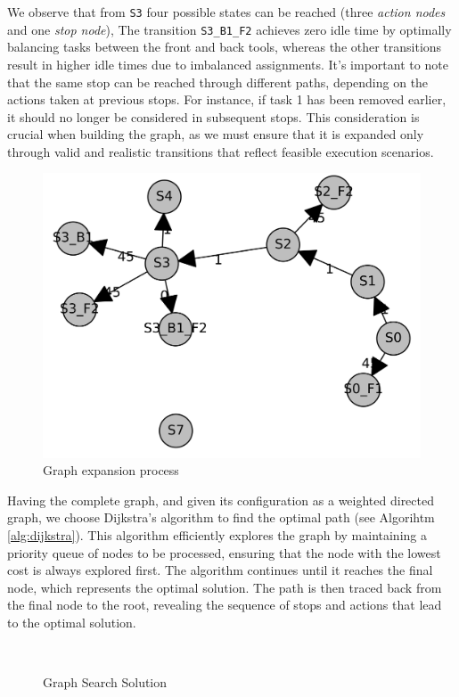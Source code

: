 We observe that from \texttt{S3} four possible states can be reached (three \textit{action nodes} and one \textit{stop node}), The transition \texttt{S3\_B1\_F2} achieves zero idle time by optimally balancing tasks between the front and back tools, whereas the other transitions result in higher idle times due to imbalanced assignments. It's important to note that the same stop can be reached through different paths, depending on the actions taken at previous stops. For instance, if task 1 has been removed earlier, it should no longer be considered in subsequent stops. This consideration is crucial when building the graph, as we must ensure that it is expanded only through valid and realistic transitions that reflect feasible execution scenarios.

\begin{figure}[hbt]
    \centering
    \includegraphics[width=0.7\linewidth]{gfx/ch02/building_graph.png}
    \caption{Graph expansion process}
    \label{fig:building-graph}
\end{figure}

Having the complete graph, and given its configuration as a weighted directed graph, we choose Dijkstra's algorithm to find the optimal path (see Algorihtm \ref{alg:dijkstra}). This algorithm efficiently explores the graph by maintaining a priority queue of nodes to be processed, ensuring that the node with the lowest cost is always explored first. The algorithm continues until it reaches the final node, which represents the optimal solution. The path is then traced back from the final node to the root, revealing the sequence of stops and actions that lead to the optimal solution.

\begin{figure}[htb]
    \myfloatalign
     \quad
     \\
    \caption{Graph Search Solution}\label{fig:graph-search-solution}
\end{figure}

